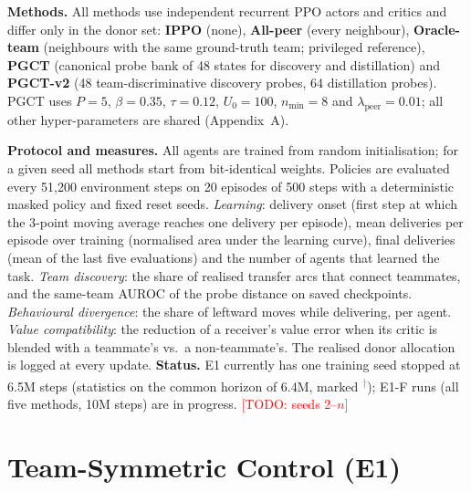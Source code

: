 \documentclass{article}
\newcommand{\todo}[1]{\textcolor{red}{[TODO: #1]}}
\newcommand{\pilot}{\textsuperscript{\textcolor{gray}{$\dagger$}}}
\newcommand{\ours}{PGCT}
\begin{document}
\textbf{Methods.} All methods use independent recurrent PPO actors and critics and differ only in the donor set:
\textbf{IPPO} (none), \textbf{All-peer} (every neighbour), \textbf{Oracle-team} (neighbours with the same ground-truth
team; privileged reference), \textbf{\ours{}} (canonical probe bank of 48 states for discovery and distillation) and
\textbf{\ours{}-v2} (48 team-discriminative discovery probes, 64 distillation probes). \ours{} uses $P=5$, $\beta=0.35$,
$\tau=0.12$, $U_0=100$, $n_{\min}=8$ and $\lambda_{\mathrm{peer}}=0.01$; all other hyper-parameters are shared (Appendix~A).

\textbf{Protocol and measures.} All agents are trained from random initialisation; for a given seed all methods start
from bit-identical weights. Policies are evaluated every 51{,}200 environment steps on 20 episodes of 500 steps with a
deterministic masked policy and fixed reset seeds. \emph{Learning}: delivery onset (first step at which the 3-point
moving average reaches one delivery per episode), mean deliveries per episode over training (normalised area under the
learning curve), final deliveries (mean of the last five evaluations) and the number of agents that learned the task.
\emph{Team discovery}: the share of realised transfer arcs that connect teammates, and the same-team AUROC of the probe
distance on saved checkpoints. \emph{Behavioural divergence}: the share of leftward moves while delivering, per agent.
\emph{Value compatibility}: the reduction of a receiver's value error when its critic is blended with a teammate's vs.\
a non-teammate's. The realised donor allocation is logged at every update.
\textbf{Status.} E1 currently has one training seed stopped at 6.5M steps (statistics on the common horizon of 6.4M,
marked \pilot); E1-F runs (all five methods, 10M steps) are in progress. \todo{seeds 2--$n$}

\section{Team-Symmetric Control (E1)}
\label{sec:control}
\end{document}
